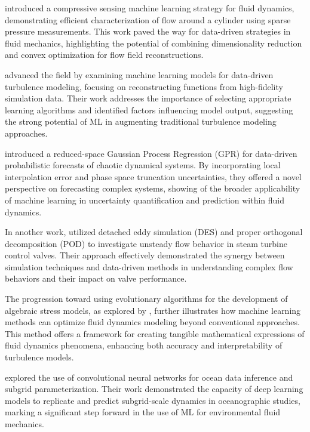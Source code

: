  introduced a compressive sensing machine learning strategy for fluid dynamics, demonstrating efficient characterization of flow around a cylinder using sparse pressure measurements. This work paved the way for data-driven strategies in fluid mechanics, highlighting the potential of combining dimensionality reduction and convex optimization for flow field reconstructions. 

 advanced the field by examining machine learning models for data-driven turbulence modeling, focusing on reconstructing functions from high-fidelity simulation data. Their work addresses the importance of selecting appropriate learning algorithms and identified factors influencing model output, suggesting the strong potential of ML in augmenting traditional turbulence modeling approaches.

\cite{Wan2017a} introduced a reduced-space Gaussian Process Regression (GPR) for data-driven probabilistic forecasts of chaotic dynamical systems. By incorporating local interpolation error and phase space truncation uncertainties, they offered a novel perspective on forecasting complex systems, showing of the broader applicability of machine learning in uncertainty quantification and prediction within fluid dynamics.

In another work,  utilized detached eddy simulation (DES) and proper orthogonal decomposition (POD) to investigate unsteady flow behavior in steam turbine control valves. Their approach effectively demonstrated the synergy between simulation techniques and data-driven methods in understanding complex flow behaviors and their impact on valve performance.

The progression toward using evolutionary algorithms for the development of algebraic stress models, as explored by , further illustrates how machine learning methods can optimize fluid dynamics modeling beyond conventional approaches. This method offers a framework for creating tangible mathematical expressions of fluid dynamics phenomena, enhancing both accuracy and interpretability of turbulence models.

 explored the use of convolutional neural networks for ocean data inference and subgrid parameterization. Their work demonstrated the capacity of deep learning models to replicate and predict subgrid-scale dynamics in oceanographic studies, marking a significant step forward in the use of ML for environmental fluid mechanics.

